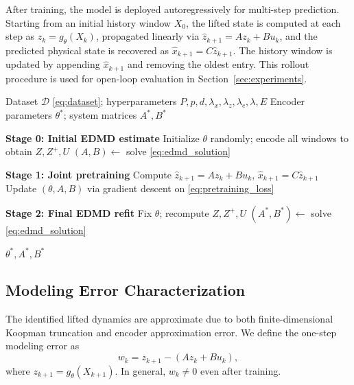\documentclass[journal]{IEEEtran}
\begin{document}
After training, the model is deployed autoregressively for multi-step prediction. Starting from an initial history window $X_0$, the lifted state is computed at each step as $z_k = g_\theta(X_k)$, propagated linearly via $\hat{z}_{k+1} = A z_k + B u_k$, and the predicted physical state is recovered as $\hat{x}_{k+1} = C\hat{z}_{k+1}$. The history window is updated by appending $\hat{x}_{k+1}$ and removing the oldest entry. This rollout procedure is used for open-loop evaluation in Section~\ref{sec:experiments}.

\begin{algorithm}[!t]
\caption{Transformer-Koopman Training Pipeline}
\label{alg:training}
\begin{algorithmic}[1]
\REQUIRE Dataset $\mathcal{D}$ \eqref{eq:dataset}; hyperparameters $P,p,d,\lambda_x,\lambda_z,\lambda_c,\lambda,E$
\ENSURE Encoder parameters $\theta^{*}$; system matrices $A^{*},B^{*}$

\STATE \textbf{Stage 0: Initial EDMD estimate}
\STATE Initialize $\theta$ randomly; encode all windows to obtain $Z,Z^{+},U$
\STATE $(A,B)\leftarrow$ solve \eqref{eq:edmd_solution}

\STATE \textbf{Stage 1: Joint pretraining}
        \STATE Compute $\hat{z}_{k+1}=Az_k+Bu_k$, $\hat{x}_{k+1}=C\hat{z}_{k+1}$
        \STATE Update $(\theta,A,B)$ via gradient descent on \eqref{eq:pretraining_loss}
    \ENDFOR
\ENDFOR

\STATE \textbf{Stage 2: Final EDMD refit}
\STATE Fix $\theta$; recompute $Z,Z^{+},U$
\STATE $(A^{*},B^{*})\leftarrow$ solve \eqref{eq:edmd_solution}

\RETURN $\theta^{*}, A^{*}, B^{*}$
\end{algorithmic}
\end{algorithm}

\subsection{Modeling Error Characterization}
\label{subsec:modeling_error}

The identified lifted dynamics are approximate due to both finite-dimensional Koopman truncation and encoder approximation error. We define the one-step modeling error as
\begin{equation}
    w_k = z_{k+1} - (A z_k + B u_k),
    \label{eq:modeling_error}
\end{equation}
where $z_{k+1} = g_\theta(X_{k+1})$. In general, $w_k \neq 0$ even after training.
\end{document}
